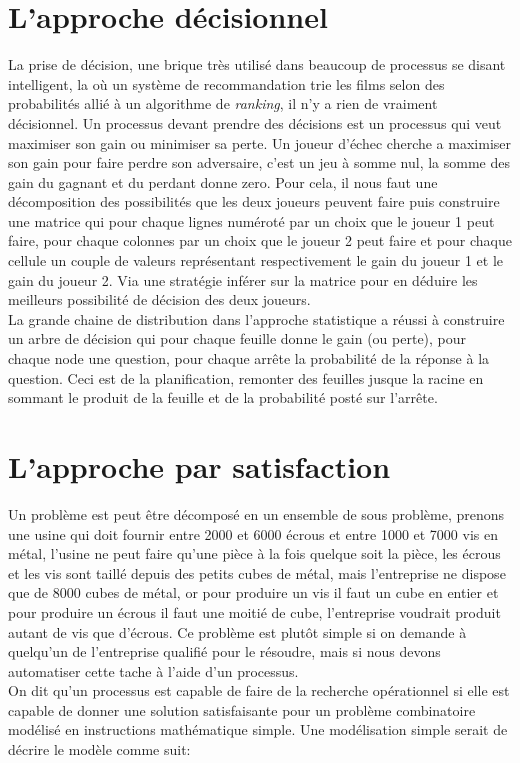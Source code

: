 \section{L'approche décisionnel}

La prise de décision, une brique très utilisé dans beaucoup de processus se disant intelligent, la où un système de recommandation trie les films selon des probabilités allié à un algorithme de \textit{ranking}, il n'y a rien de vraiment décisionnel. Un processus devant prendre des décisions est un processus qui veut maximiser son gain ou minimiser sa perte. Un joueur d'échec cherche a maximiser son gain pour faire perdre son adversaire, c'est un jeu à somme nul, la somme des gain du gagnant et du perdant donne zero. Pour cela, il nous faut une décomposition des possibilités que les deux joueurs peuvent faire puis construire une matrice qui pour chaque lignes numéroté par un choix que le joueur 1 peut faire, pour chaque colonnes par un choix que le joueur 2 peut faire et pour chaque cellule un couple de valeurs représentant respectivement le gain du joueur 1 et le gain du joueur 2. Via une stratégie inférer sur la matrice pour en déduire les meilleurs possibilité de décision des deux joueurs.\\
\linebreak
La grande chaine de distribution dans l'approche statistique a réussi à construire un arbre de décision qui pour chaque feuille donne le gain (ou perte), pour chaque node une question, pour chaque arrête la probabilité de la réponse à la question. Ceci est de la planification, remonter des feuilles jusque la racine en sommant le produit de la feuille et de la probabilité posté sur l'arrête.\\
\pagebreak

\section{L'approche par satisfaction}

Un problème est peut être décomposé en un ensemble de sous problème, prenons une usine qui doit fournir entre 2000 et 6000 écrous et entre 1000 et 7000 vis en métal, l'usine ne peut faire qu'une pièce à la fois quelque soit la pièce, les écrous et les vis sont taillé depuis des petits cubes de métal, mais l'entreprise ne dispose que de 8000 cubes de métal, or pour produire un vis il faut un cube en entier et pour produire un écrous il faut une moitié de cube, l'entreprise voudrait produit autant de vis que d'écrous. Ce problème est plutôt simple si on demande à quelqu'un de l'entreprise qualifié pour le résoudre, mais si nous devons automatiser cette tache à l'aide d'un processus.\\
\linebreak
On dit qu'un processus est capable de faire de la recherche opérationnel si elle est capable de donner une solution satisfaisante pour un problème combinatoire modélisé en instructions mathématique simple. Une modélisation simple serait de décrire le modèle comme suit:

